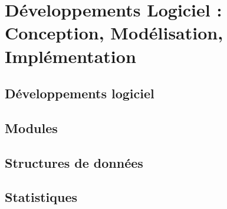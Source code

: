 \chapter{Développements Logiciel : Conception, Modélisation, Implémentation} 

\section{Développements logiciel}

\section{Modules}

\section{Structures de données}

\section{Statistiques}

\clearpage